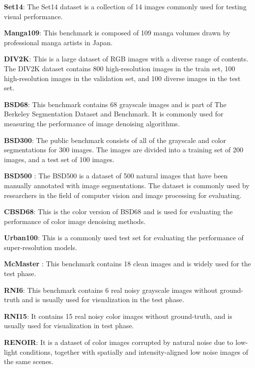 \documentclass[conference]{IEEEtran}
\begin{document}
{\bf Set14}\cite{zeyde2012single}: The Set14 dataset is a collection of 14 images commonly used for testing visual performance.

{\bf Manga109}\cite{aizawa2020building}: This benchmark is composed of 109 manga volumes drawn by professional manga artists in Japan.

{\bf DIV2K}\cite{agustsson2017ntire}: This is a large dataset of RGB images with a diverse range of contents. The DIV2K dataset contains 800 high-resolution images in the train set, 100 high-resolution images in the validation set, and 100 diverse images in the test set.

{\bf BSD68}\cite{roth2005fields}: This benchmark contains 68 grayscale images and is part of The Berkeley Segmentation Dataset and Benchmark. It is commonly used for measuring the performance of image denoising algorithms.

{\bf BSD300}\cite{martin2001database}: The public benchmark consists of all of the grayscale and color segmentations for 300 images. The images are divided into a training set of 200 images, and a test set of 100 images.

{\bf BSD500} \cite{arbelaez2010contour}: The BSD500 is a dataset of 500 natural images that have been manually annotated with image segmentations. The dataset is commonly used by researchers in the field of computer vision and image processing for evaluating.

{\bf CBSD68}\cite{roth2005fields}: This is the color version of BSD68 and is used for evaluating the performance of color image denoising methods.

{\bf Urban100}\cite{huang2015single}: This is a commonly used test set for evaluating the performance of super-resolution models.

{\bf McMaster} \cite{zhang2011color}: This benchmark contains 18 clean images and is widely used for the test phase.

{\bf RNI6}\cite{lebrun2015noise}: This benchmark contains 6 real noisy grayscale images without ground-truth and is usually used for visualization in the test phase.

{\bf RNI15}\cite{lebrun2015noise}: It contains 15 real noisy color images without ground-truth, and is usually used for visualization in test phase.

{\bf RENOIR}\cite{anaya2018renoir}: It is a dataset of color images corrupted by  natural noise due to low-light conditions, together with spatially and intensity-aligned low noise images of the same scenes.
\end{document}
